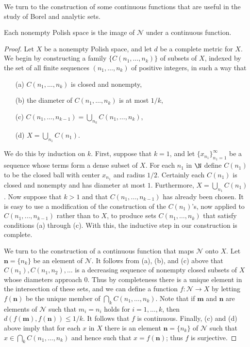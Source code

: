 We turn to the construction of some continuous functions that are useful in the study of Borel and analytic sets.
\begin{proposition}\label{Polish is continuous image of N^N}
Each nonempty Polish space is the image of $\mathscr{N}$ under a continuous function.
\end{proposition}
\begin{proof}
Let $X$ be a nonempty Polish space, and let $d$ be a complete metric for $X$. We begin by constructing a family $\{C(n_1,\dots,n_k)\}$ of subsets of $X$, indexed by the set of all finite sequences $(n_1,\dots,n_k)$ of positive integers, in such a way that
\begin{itemize}
\item[(a)] $C(n_1,\dots,n_k)$ is closed and nonempty,
\item[(b)] the diameter of $C(n_1,\dots,n_k)$ is at most $1/k$,
\item[(c)] $C(n_1,\dots,n_{k-1})=\bigcup_{n_k}C(n_1,\dots,n_{k})$,
\item[(d)] $X=\bigcup_{n_1}C(n_1)$.
\end{itemize}
We do this by induction on $k$. First, suppose that $k=1$, and let $\{x_{n_1}\}_{n_1=1}^{\infty}$ be a sequence whose terms form a dense subset of $X$. For each $n_1$ in $\N$ define $C(n_1)$ to be the closed ball with center $x_{n_1}$ and radius $1/2$. Certainly each $C(n_1)$ is closed and nonempty and has diameter at most $1$. Furthermore, $X=\bigcup_{n_1}C(n_1)$. Now suppose that $k>1$ and that $C(n_1,\dots,n_{k-1})$ has already been chosen. It is easy to use a modification of the construction of the $C(n_1)$'s, now applied to $C(n_1,\dots,n_{k-1})$ rather than to $X$, to produce sets $C(n_1,\dots,n_k)$ that satisfy conditions (a) through (c). With this, the inductive step in our construction is complete.\par
We turn to the construction of a continuous function that maps $\mathscr{N}$ onto $X$. Let $\mathbf{n}=\{n_k\}$ be an element of $\mathscr{N}$. It follows from (a), (b), and (c) above that $C(n_1),C(n_1,n_2),\dots$ is a decreasing sequence of nonempty closed subsets of $X$ whose diameters approach $0$. Thus by completeness there is a unique element in the intersection of these sets, and we can define a function $f:\mathscr{N}\to X$ by letting $f(\mathbf{n})$ be the unique member of $\bigcap_kC(n_1,\dots,n_k)$. Note that if $\mathbf{m}$ and $\mathbf{n}$ are elements of $\mathscr{N}$ such that $m_i=n_i$ holds for $i=1,\dots,k$, then $d(f(\mathbf{m}),f(\mathbf{n}))\leq 1/k$. It follows that $f$ is continuous. Finally, (c) and (d) above imply that for each $x$ in $X$ there is an element $\mathbf{n}=\{n_k\}$ of $\mathscr{N}$ such that $x\in\bigcap_kC(n_1,\dots,n_k)$ and hence such that $x=f(\mathbf{n})$; thus $f$ is surjective.
\end{proof}
